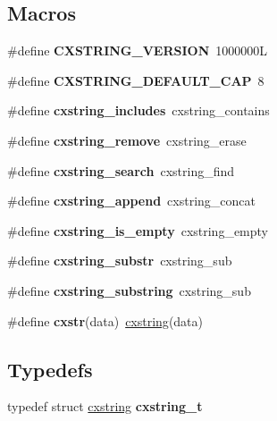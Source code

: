 \subsection*{Macros}
\begin{DoxyCompactItemize}
\item 
\mbox{\label{a00026_aeac35aa4fb83ef3b146347bb6385a5b0}} 
\#define {\bfseries C\+X\+S\+T\+R\+I\+N\+G\+\_\+\+V\+E\+R\+S\+I\+ON}~1000000L
\item 
\mbox{\label{a00026_ac7d228210f438fd32024f6de3cc0eb77}} 
\#define {\bfseries C\+X\+S\+T\+R\+I\+N\+G\+\_\+\+D\+E\+F\+A\+U\+L\+T\+\_\+\+C\+AP}~8
\item 
\mbox{\label{a00026_aed724d66437ae2f709d39f44e68ef873}} 
\#define {\bfseries cxstring\+\_\+includes}~cxstring\+\_\+contains
\item 
\mbox{\label{a00026_aafb26af310693775a68bdcca40b83966}} 
\#define {\bfseries cxstring\+\_\+remove}~cxstring\+\_\+erase
\item 
\mbox{\label{a00026_a878e400c242403fc5a2b736e3a1ece69}} 
\#define {\bfseries cxstring\+\_\+search}~cxstring\+\_\+find
\item 
\mbox{\label{a00026_aa1456f39cf8b871d043bc10bad1e2e7d}} 
\#define {\bfseries cxstring\+\_\+append}~cxstring\+\_\+concat
\item 
\mbox{\label{a00026_a317d7942f1fd71079f6a6dc11ef6231d}} 
\#define {\bfseries cxstring\+\_\+is\+\_\+empty}~cxstring\+\_\+empty
\item 
\mbox{\label{a00026_afa17d12300611e8985407ea47070df94}} 
\#define {\bfseries cxstring\+\_\+substr}~cxstring\+\_\+sub
\item 
\mbox{\label{a00026_a40d13693bc5add409b6b13601b4fc102}} 
\#define {\bfseries cxstring\+\_\+substring}~cxstring\+\_\+sub
\item 
\mbox{\label{a00026_a173c568ed7201c70ca8c487058d762e2}} 
\#define {\bfseries cxstr}(data)~\hyperlink{a00072}{cxstring}(data)
\end{DoxyCompactItemize}
\subsection*{Typedefs}
\begin{DoxyCompactItemize}
\item 
\mbox{\label{a00026_a7c8cb74c1394a3e8b16552d9ca2d2e22}} 
typedef struct \hyperlink{a00072}{cxstring} {\bfseries cxstring\+\_\+t}
\end{DoxyCompactItemize}
